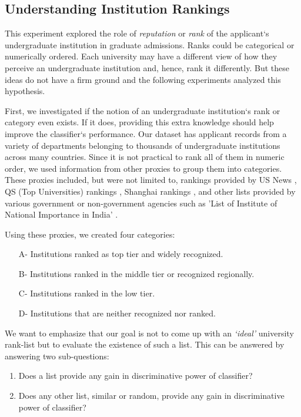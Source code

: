\documentclass{sig-alternate-05-2015}
\begin{document}
\subsection{Understanding Institution Rankings}
\label{subsec:ranking-exp}
This experiment explored the role of \textit{reputation} or \textit{rank} of the applicant`s undergraduate institution in graduate admissions. Ranks could be categorical or numerically ordered. Each university may have a different view of how they perceive an undergraduate institution and, hence, rank it differently. But these ideas do not have a firm ground and the following experiments analyzed this hypothesis.

First, we investigated if the notion of an undergraduate institution`s rank or category even exists. If it does, providing this extra knowledge should help improve the classifier`s performance. Our dataset has applicant records from a variety of departments belonging to thousands of undergraduate institutions across many countries. Since it is not practical to rank all of them in numeric order, we used information from other proxies to group them into categories. These proxies included, but were not limited to, rankings provided by US News \cite{usnews}, QS (Top Universities) rankings \cite{qs}, Shanghai rankings \cite{shanghai}, and other lists provided by various government or non-government agencies such as 'List of Institute of National Importance in India' \cite{national-importance}.

Using these proxies, we created four categories:
\begin{itemize}
\item[A-] Institutions ranked as top tier and widely recognized.
\item[B-] Institutions ranked in the middle tier or recognized regionally.
\item[C-] Institutions ranked in the low tier.
\item[D-] Institutions that are neither recognized nor ranked.
\end{itemize}
We want to emphasize that our goal is not to come up with an \textit{`ideal'} university rank-list but to evaluate the existence of such a list. This can be answered by answering two sub-questions:
\begin{enumerate}
\item Does a list provide any gain in discriminative power of classifier?
\item Does any other list, similar or random, provide any gain in discriminative power of classifier?
\end{enumerate}
\end{document}
